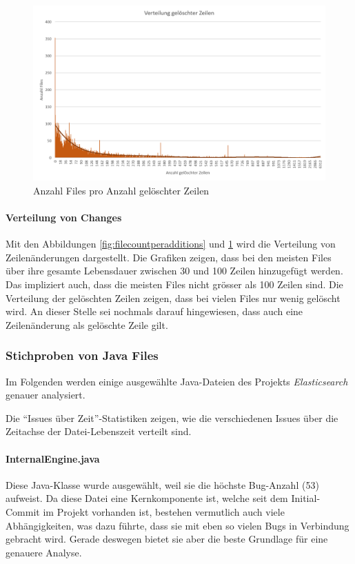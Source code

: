 \documentclass[10pt, a4paper]{article}
\begin{document}
\begin{figure}[!ht]
	\centering
	\includegraphics[width=1\textwidth]{resources/images/chart_deletion_distribution.png}
	\caption{Anzahl Files pro Anzahl gelöschter Zeilen}
	\label{fig:filecountperdeletions}
\end{figure}

\paragraph{Verteilung von Changes} Mit den Abbildungen \ref{fig:filecountperadditions} und \ref{fig:filecountperdeletions} wird die Verteilung von Zeilenänderungen dargestellt. Die Grafiken zeigen, dass bei den meisten Files über ihre gesamte Lebensdauer zwischen 30 und 100 Zeilen hinzugefügt werden. Das impliziert auch, dass die meisten Files nicht grösser als 100 Zeilen sind. Die Verteilung der gelöschten Zeilen zeigen, dass bei vielen Files nur wenig gelöscht wird. An dieser Stelle sei nochmals darauf hingewiesen, dass auch eine Zeilenänderung als gelöschte Zeile gilt.


\subsubsection{Stichproben von Java Files} \label{sec:filesamplestatistics}

Im Folgenden werden einige ausgewählte Java-Dateien des Projekts \emph{Elasticsearch} genauer analysiert.

Die ``Issues über Zeit''-Statistiken zeigen,  wie die verschiedenen Issues über die Zeitachse der Datei-Lebenszeit verteilt sind.

\paragraph{InternalEngine.java} Diese Java-Klasse wurde ausgewählt, weil sie die höchs\-te Bug-Anzahl (53) aufweist. Da diese Datei eine Kernkomponente ist, welche seit dem Initial-Commit im Projekt vorhanden ist, bestehen vermutlich auch viele Abhängigkeiten, was dazu führte, dass sie mit eben so vielen Bugs in Verbindung gebracht wird. Gerade deswegen bietet sie aber die beste Grundlage für eine genauere Analyse.
\end{document}

